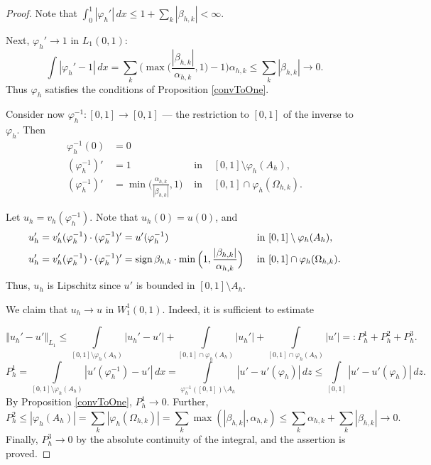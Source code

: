 \documentclass[12pt]{article}
\newcommand{\norm}[1]{\left\Vert#1\right\Vert}
\newcommand{\abs}[1]{\left\vert#1\right\vert}
\renewcommand{\phi}{\varphi}
\renewcommand{\le}{\leqslant}
\newcommand{\W}{W_1^1}
\newcommand{\sign}{\mathop{\rm sign}\nolimits}
\begin{document}
\begin{proof}
Note that $\int_0^1 \abs{\phi_h'} \, dx \le 1 + \sum_k \abs{\beta_{h,k}} < \infty$.

Next, $\phi_h' \to 1$ in $L_1(0, 1)$:
$$\int \abs{\phi_h' - 1} \, dx = \sum\limits_k \Big( \max \Big( \frac{\abs{\beta_{h,k}}}{\alpha_{h,k}}, 1 \Big) - 1 \Big) \alpha_{h,k} \le
\sum\limits_k \abs{\beta_{h,k}} \to 0.$$
Thus $\phi_h$ satisfies the conditions of Proposition \ref{convToOne}.

Consider now $\phi_h^{-1}: [0, 1] \to [0, 1]$ --- the restriction to $[0, 1]$ of the inverse to $\phi_h$.
Then
$$
\begin{aligned}
\phi_h^{-1} ( 0 ) &= 0 & & \\
( \phi_h^{-1} )' &=  1 & \text{ in } & [0, 1] \setminus \phi_h( A_h ),\\
( \phi_h^{-1} )' &=  \min \Big( \frac{ \alpha_{h,k} }{ \abs{ \beta_{h,k} } }, 1 \Big) & \text{ in } & [0, 1] \cap \phi_h( \Omega_{h,k} ).
\end{aligned}
$$

Let $u_h = v_h( \phi_h^{-1} )$.
Note that $u_h(0) = u(0)$, and
\begin{align*}
u_h' &=  v_h'( \phi_h^{-1} ) \cdot ( \phi_h^{-1} )' = u'( \phi_h^{-1} ) & \text{ in } & [0, 1] \setminus \phi_h( A_h ),\\
u_h' &=  v_h'( \phi_h^{-1} ) \cdot ( \phi_h^{-1} )' = 
\sign{ \beta_{h,k} } \cdot \min \Big( 1, \frac{ \abs{ \beta_{h,k} } }{ \alpha_{h,k} } \Big) & \text{ in } & [0, 1] \cap \phi_h( \Omega_{h,k} ).
\end{align*}
Thus, $u_h$ is Lipschitz since $u'$ is bounded in $[0, 1] \setminus A_h$.

We claim that $u_h \to u$ in $\W(0, 1)$. Indeed, it is sufficient to estimate

$$\norm{u_h' - u'}_{L_1} \le \int\limits_{[0, 1] \setminus \phi_h(A_h)} \abs{u_h' - u'} + 
\int\limits_{[0, 1] \cap \phi_h(A_h)} \abs{u_h'} + \int\limits_{[0, 1] \cap \phi_h(A_h)} \abs{u'} =: P_h^1 + P_h^2 + P_h^3.$$
$$P_h^1 = \int\limits_{[0, 1] \setminus \phi_h( A_h )} \abs{u'( \phi_h^{-1} ) - u'} \, dx =
\int\limits_{\phi_h^{-1} ( [0, 1] ) \setminus A_h} \abs{u' - u'( \phi_h )} \, dz \le
\int\limits_{[0, 1]} \abs{u' - u'( \phi_h )} \, dz.$$
By Proposition \ref{convToOne}, $P_h^1 \to 0$.
Further,
$$P_h^2 \le \abs{\phi_h( A_h )} = \sum\limits_k \abs{\phi_h( \Omega_{h,k} )} = \sum\limits_k \max (\abs{\beta_{h,k}}, \alpha_{h,k})
\le \sum\limits_k \alpha_{h,k} + \sum\limits_k \abs{\beta_{h,k}} \to 0.$$
Finally, $P_h^3 \to 0$ by the absolute continuity of the integral, and the assertion is proved.


\end{proof}
\end{document}

